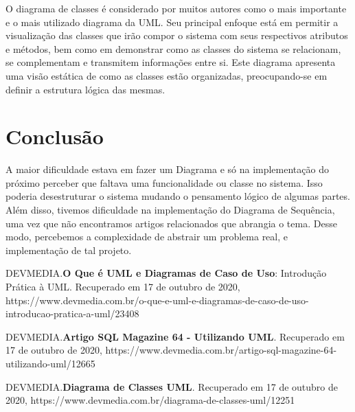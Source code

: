 \documentclass[a4paper]{article}
\begin{document}
  O diagrama de classes é considerado por muitos autores como o mais importante e
  o mais utilizado diagrama da UML. Seu principal enfoque está em permitir a visualização
  das classes que irão compor o sistema com seus respectivos atributos e métodos,
  bem como em demonstrar como as classes do sistema se relacionam, se complementam e
  transmitem informações entre si. Este diagrama apresenta uma visão estática de como
  as classes estão organizadas, preocupando-se em definir a estrutura lógica das mesmas.

  \section{Conclusão}
  A maior dificuldade estava em fazer um Diagrama e só na implementação do próximo
  perceber que faltava uma funcionalidade ou classe no sistema. Isso poderia desestruturar
  o sistema mudando o pensamento lógico de algumas partes.\\
  Além disso, tivemos dificuldade na implementação do  Diagrama de Sequência,
  uma vez que não encontramos artigos relacionados que abrangia o tema.
  Desse modo, percebemos a complexidade de abstrair um problema real,
  e implementação de tal projeto.

  \newpage
  \begin{thebibliography}{4}
    DEVMEDIA.\textbf{O Que é UML e Diagramas de Caso de Uso}: Introdução Prática à UML. 
    Recuperado em 17 de outubro de 2020,
    https://www.devmedia.com.br/o-que-e-uml-e-diagramas-de-caso-de-uso-introducao-pratica-a-uml/23408

    DEVMEDIA.\textbf{Artigo SQL Magazine 64 - Utilizando UML}. 
    Recuperado em 17 de outubro de 2020,
    https://www.devmedia.com.br/artigo-sql-magazine-64-utilizando-uml/12665
  
    DEVMEDIA.\textbf{Diagrama de Classes UML}. 
    Recuperado em 17 de outubro de 2020,
    https://www.devmedia.com.br/diagrama-de-classes-uml/12251
    \end{thebibliography}
     
  
\end{document}
